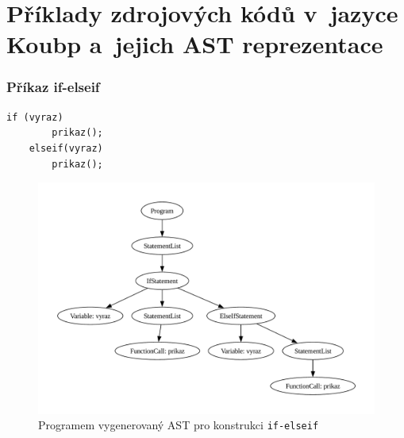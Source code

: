 
%


\chapter{Příklady zdrojových kódů v~jazyce Koubp a~jejich AST reprezentace}

\subsection*{Příkaz if-elseif}
\begin{lstlisting}[language=Koubp]
    if (vyraz)
        prikaz();
    elseif(vyraz)
        prikaz();
\end{lstlisting}
\begin{figure}[ht]
    \centering
    \includegraphics[width=\textwidth]{obrazky-figures/ast_if_elseif.pdf}
    \caption{Programem vygenerovaný AST pro konstrukci \texttt{if-elseif}}
    \label{fig_ast_elseif}
\end{figure}

